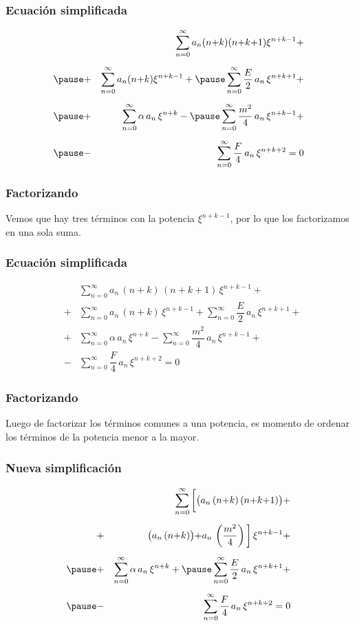 \begin{frame}
\frametitle{Ecuación simplificada}
\vspace{-1cm}
\begin{eqnarray*}
&{}& \sum_{n=0}^{\infty} a_{n} (n {+} k) (n {+} k {+} 1) \xi^{n{+}k{-}1} + \\[0.5em] \pause
&+& \sum_{n=0}^{\infty} a_{n} (n {+} k) \xi^{n{+}k{-}1} + \pause \sum_{n=0}^{\infty} \dfrac{E}{2} \, a_{n} \, \xi^{n{+}k{+}1} + \\[0.5em] \pause
&+& \sum_{n=0}^{\infty} \alpha \, a_{n} \, \xi^{n{+}k} - \pause \sum_{n=0}^{\infty}  \dfrac{m^{2}}{4} \, a_{n} \, \xi^{n{+}k{-}1} + \\[0.5em]\pause
&-& \sum_{n=0}^{\infty} \dfrac{F}{4} \, a_{n} \, \xi^{n{+}k{+}2} = 0
\end{eqnarray*}
\end{frame}
\begin{frame}
\frametitle{Factorizando}
Vemos que hay tres términos con la potencia $\xi^{n+k-1}$, por lo que los factorizamos en una sola suma.
\end{frame}
\begin{frame}
\frametitle{Ecuación simplificada}
\vspace{-1cm}
\begin{eqnarray*}
&{}& \sum_{n=0}^{\infty} a_{n} \, (n {+} k) \, (n {+} k {+} 1) \, \xi^{n{+}k{-}1} + \\[0.5em]
&+& \sum_{n=0}^{\infty} a_{n} \, (n {+} k) \, \xi^{n{+}k{-}1} + \sum_{n=0}^{\infty} \dfrac{E}{2} \, a_{n} \, \xi^{n{+}k{+}1} + \\[0.5em]
&+& \sum_{n=0}^{\infty} \alpha \, a_{n} \, \xi^{n{+}k} - \sum_{n=0}^{\infty}  \dfrac{m^{2}}{4} \, a_{n} \, \xi^{n{+}k{-}1} + \\[0.5em]
&-& \sum_{n=0}^{\infty} \dfrac{F}{4} \, a_{n} \, \xi^{n{+}k{+}2} = 0
\end{eqnarray*}
\end{frame}
\begin{frame}
\frametitle{Factorizando}
Luego de factorizar los términos comunes a una potencia,  es momento de ordenar los términos de la potencia menor a la mayor.
\end{frame}
\begin{frame}
\frametitle{Nueva simplificación}
\vspace{-1cm}
\begin{eqnarray*}
&{}& \sum_{n=0}^{\infty} \bigg[ \big( a_{n} \, (n {+} k) \, (n {+} k {+} 1) \big) + \\[0.5em]
&+& \big( a_{n} \, (n {+} k) \big) {+} a_{n} \, \left( \dfrac{m^{2}}{4} \right) \bigg] \, \xi^{n+k-1} + \\[0.5em] \pause
&+& \sum_{n=0}^{\infty} \alpha \, a_{n} \, \xi^{n+k} + \pause \sum_{n=0}^{\infty} \dfrac{E}{2} \, a_{n} \, \xi^{n+k+1} + \\[0.5em] \pause
&-& \sum_{n=0}^{\infty} \dfrac{F}{4} \, a_{n} \, \xi^{n+k+2} = 0
\end{eqnarray*}
\end{frame}
